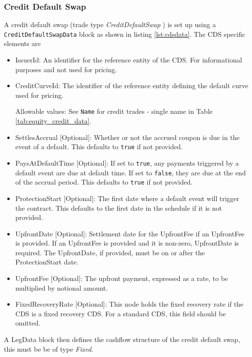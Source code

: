 \subsubsection{Credit Default Swap}

A credit default swap (trade type \emph{CreditDefaultSwap} ) is set up using a {\tt CreditDefaultSwapData} block as shown in listing \ref{lst:cdsdata}. The CDS specific elements
are

\begin{itemize}
\item IssuerId: An identifier for the reference entity of the CDS. For informational purposes and not used for pricing.
\item CreditCurveId: The identifier of the reference entity defining the default curve used for pricing.

Allowable values: See \lstinline!Name! for credit trades - single name in Table \ref{tab:equity_credit_data}. \\

\item SettlesAccrual [Optional]: Whether or not the accrued coupon is due in the event of a default. This defaults to \lstinline!true! if not provided.
\item PaysAtDefaultTime [Optional]: If set to \lstinline!true!, any payments triggered by a default event are due at default time. If set to \lstinline!false!, they are due at the end of the accrual period. This defaults to \lstinline!true! if not provided.
\item ProtectionStart [Optional]: The first date where a default event will trigger the contract. This defaults to the first date in the schedule if it is not provided.
\item UpfrontDate [Optional]: Settlement date for the UpfrontFee if an UpfrontFee is provided. If an UpfrontFee is provided and it is non-zero, UpfrontDate is required. The UpfrontDate, if provided, must be on or after the ProtectionStart date.
\item UpfrontFee [Optional]: The upfront payment, expressed as a rate, to be multiplied by notional amount.
\item FixedRecoveryRate [Optional]: This node holds the fixed recovery rate if the CDS is a fixed recovery CDS. For a standard CDS, this field should be omitted.
\end{itemize}

A LegData block then defines the cashflow structure of the credit default swap, this must be be of type \emph{Fixed}.

